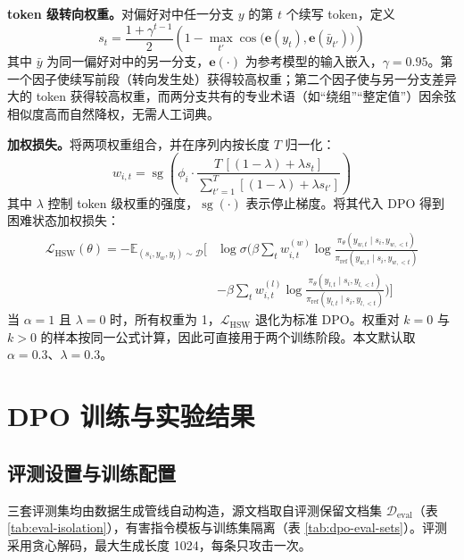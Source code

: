 \documentclass[fontset=fandol,type=master,campus=shenzhen,etitleauto=true]{hithesisbook}
\begin{document}
\textbf{token 级转向权重。}对偏好对中任一分支 $y$ 的第 $t$ 个续写 token，定义
\begin{equation}
s_t = \frac{1 + \gamma^{t-1}}{2} \left( 1 - \max_{t'} \cos\!\big(\mathbf{e}(y_t), \mathbf{e}(\bar{y}_{t'})\big) \right)
\end{equation}
其中 $\bar{y}$ 为同一偏好对中的另一分支，$\mathbf{e}(\cdot)$ 为参考模型的输入嵌入，$\gamma = 0.95$。第一个因子使续写前段（转向发生处）获得较高权重；第二个因子使与另一分支差异大的 token 获得较高权重，而两分支共有的专业术语（如“绕组”“整定值”）因余弦相似度高而自然降权，无需人工词典。

\textbf{加权损失。}将两项权重组合，并在序列内按长度 $T$ 归一化：
\begin{equation}
w_{i,t} = \operatorname{sg}\!\left( \phi_i \cdot \frac{T\,[(1 - \lambda) + \lambda s_t]}{\sum_{t'=1}^{T} [(1 - \lambda) + \lambda s_{t'}]} \right)
\end{equation}
其中 $\lambda$ 控制 token 级权重的强度，$\operatorname{sg}(\cdot)$ 表示停止梯度。将其代入 DPO 得到困难状态加权损失：
\begin{equation}
\begin{aligned}
\mathcal{L}_{\text{HSW}}(\theta) = -\mathbb{E}_{(s_i,y_w,y_l)\sim\mathcal{D}}\Bigg[
&\log\sigma\Bigg(\beta\sum_{t}w_{i,t}^{(w)}\log\frac{\pi_\theta(y_{w,t}\mid s_i,y_{w,<t})}{\pi_{\text{ref}}(y_{w,t}\mid s_i,y_{w,<t})} \\
&-\beta\sum_{t}w_{i,t}^{(l)}\log\frac{\pi_\theta(y_{l,t}\mid s_i,y_{l,<t})}{\pi_{\text{ref}}(y_{l,t}\mid s_i,y_{l,<t})}\Bigg)\Bigg]
\end{aligned}
\end{equation}
当 $\alpha = 1$ 且 $\lambda = 0$ 时，所有权重为 1，$\mathcal{L}_{\text{HSW}}$ 退化为标准 DPO。权重对 $k = 0$ 与 $k > 0$ 的样本按同一公式计算，因此可直接用于两个训练阶段。本文默认取 $\alpha = 0.3$、$\lambda = 0.3$。

\section{DPO 训练与实验结果}\label{dpo-ux8badux7ec3ux4e0eux5b9eux9a8cux7ed3ux679c}

\subsection{评测设置与训练配置}\label{ux8badux7ec3ux914dux7f6e-2}

三套评测集均由数据生成管线自动构造，源文档取自评测保留文档集 $\mathcal{D}_{\text{eval}}$（表 \ref{tab:eval-isolation}），有害指令模板与训练集隔离（表 \ref{tab:dpo-eval-sets}）。评测采用贪心解码，最大生成长度 1024，每条只攻击一次。
\end{document}
